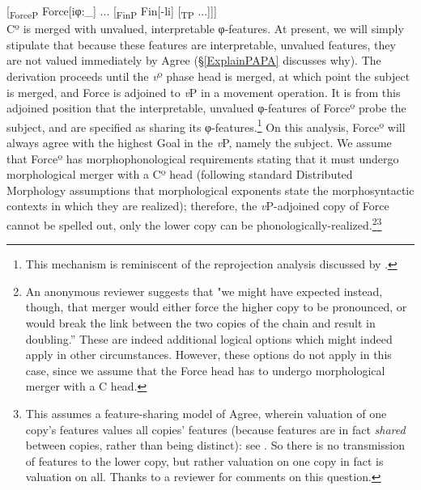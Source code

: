 \documentclass[output=paper
,modfonts
,nonflat
]{langsci/langscibook}
\begin{document}
\ea 
{[}\textsubscript{ForceP} Force[iφ:\_] ... [\textsubscript{FinP} Fin[-li] [\textsubscript{TP} ...]]]\\
\z
\noindent Cº is merged with unvalued, interpretable φ-features. At present, we will simply stipulate that because these features are interpretable, unvalued features, they are not valued immediately by Agree (\S \ref{ExplainPAPA} discusses why). The derivation proceeds until the \textit{v}º phase head is merged, at which point the subject is merged, and Force is adjoined to \textit{v}P in a movement operation. It is from this adjoined position that the interpretable, unvalued φ-features of Forceº probe the subject, and are specified as sharing its φ-features.\footnote{This mechanism is reminiscent of the reprojection analysis discussed by .} On this analysis, Forceº will always agree with the highest Goal in the \textit{v}P, namely the subject. We assume that Forceº has  morphophonological requirements stating that it must undergo morphological merger with a Cº head (following standard Distributed Morphology assumptions that morphological exponents state the morphosyntactic contexts in which they are realized); therefore, the \textit{v}P-adjoined copy of Force cannot be spelled out, only the lower copy can be phonologically-realized.\footnote{An anonymous reviewer suggests that "we might have expected instead, though, that merger would either force the higher copy to be pronounced, or would break the link between the two copies of the chain and result in doubling.” These are indeed additional logical options which might indeed apply in other circumstances. However,  these options do not apply in this case, since we assume that the Force head has to undergo morphological merger with a C head.}\footnote{This assumes a feature-sharing model of Agree, wherein valuation of one copy's features values all copies' features (because features are in fact \textit{shared} between copies, rather than being distinct): see \citet{FramptonGutmann:2000,Rooryck:2011,Pesetsky:2007}. So there is no transmission of features to the lower copy, but rather valuation on one copy in fact is valuation on all. Thanks to a reviewer for comments on this question.}

\ea \label{upwardagreelubukusu}
\end{document}
